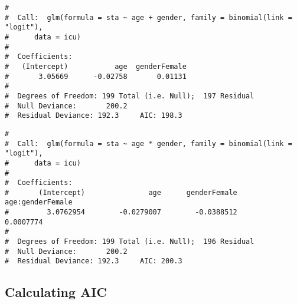 \documentclass[letterpaper,12pt,twoside,]{pinp}
\begin{document}
\begin{Shaded}
\begin{Highlighting}[]
\OperatorTok{~}\StringTok{ }\OperatorTok{+}\StringTok{ } \NormalTok{(} \NormalTok{))}
\end{Highlighting}
\end{Shaded}

\begin{ShadedResult}
\begin{verbatim}
#  
#  Call:  glm(formula = sta ~ age + gender, family = binomial(link = "logit"), 
#      data = icu)
#  
#  Coefficients:
#   (Intercept)           age  genderFemale  
#       3.05669      -0.02758       0.01131  
#  
#  Degrees of Freedom: 199 Total (i.e. Null);  197 Residual
#  Null Deviance:       200.2 
#  Residual Deviance: 192.3     AIC: 198.3
\end{verbatim}
\end{ShadedResult}

\begin{Shaded}
\begin{Highlighting}[]
\OperatorTok{~}\StringTok{ }\OperatorTok{*} \NormalTok{(} \NormalTok{))}
\end{Highlighting}
\end{Shaded}

\begin{ShadedResult}
\begin{verbatim}
#  
#  Call:  glm(formula = sta ~ age * gender, family = binomial(link = "logit"), 
#      data = icu)
#  
#  Coefficients:
#       (Intercept)               age      genderFemale  age:genderFemale  
#         3.0762954        -0.0279007        -0.0388512         0.0007774  
#  
#  Degrees of Freedom: 199 Total (i.e. Null);  196 Residual
#  Null Deviance:       200.2 
#  Residual Deviance: 192.3     AIC: 200.3
\end{verbatim}
\end{ShadedResult}

\hypertarget{calculating-aic}{%
\subsection{Calculating AIC}\label{calculating-aic}}
\end{document}
